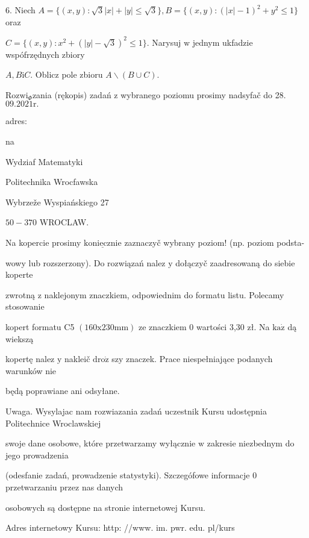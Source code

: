 \documentclass[a4paper,12pt]{article}
\begin{document}
6. Niech $A = \{(x,y):\sqrt{3}|x|+|y|\leq\sqrt{3}\}, B = \{(x,y):(|x|-1)^{2}+y^{2}\leq 1\}$ oraz

$C=\{(x,y):x^{2}+(|y|-\sqrt{3})^{2}\leq 1\}$. Narysuj $\mathrm{w}$ jednym ukfadzie wspófrzędnych zbiory

$A, B\mathrm{i}C$. Oblicz pole zbioru $A\backslash (B\cup C).$

$\mathrm{R}\mathrm{o}\mathrm{z}\mathrm{w}\mathrm{i}_{\Phi}$zania (rękopis) zadań $\mathrm{z}$ wybranego poziomu prosimy nadsyfač do 28.$09.2021\mathrm{r}.$

adres:

na

Wydziaf Matematyki

Politechnika Wrocfawska

Wybrzeže Wyspiańskiego 27

$50-370$ WROCLAW.

Na kopercie prosimy $\underline{\mathrm{k}\mathrm{o}\mathrm{n}\mathrm{i}\mathrm{e}\mathrm{c}\mathrm{z}\mathrm{n}\mathrm{i}\mathrm{e}}$ zaznaczyč wybrany poziom! (np. poziom podsta-

wowy lub rozszerzony). Do rozwiązań nalez $\mathrm{y}$ dołączyč zaadresowaną do siebie koperte

zwrotną $\mathrm{z}$ naklejonym znaczkiem, odpowiednim do formatu listu. Polecamy stosowanie

kopert formatu C5 $(160\mathrm{x}230\mathrm{m}\mathrm{m})$ ze znaczkiem $0$ wartości 3,30 zł. Na $\mathrm{k}\mathrm{a}\dot{\mathrm{z}}$ dą wiekszą

kopertę nalez $\mathrm{y}$ nakleič $\mathrm{d}\mathrm{r}\mathrm{o}\dot{\mathrm{z}}$ szy znaczek. Prace niespełniające podanych warunków nie

będą poprawiane ani odsyłane.

Uwaga. Wysylajac nam rozwiazania zadań uczestnik Kursu udostępnia Politechnice Wroclawskiej

swoje dane osobowe, które przetwarzamy wyłącznie $\mathrm{w}$ zakresie niezbednym do jego prowadzenia

(odesfanie zadań, prowadzenie statystyki). Szczegófowe informacje $0$ przetwarzaniu przez nas danych

osobowych są dostępne na stronie internetowej Kursu.

Adres internetowy Kursu: http: //www. im. pwr. edu. pl/kurs
\end{document}
